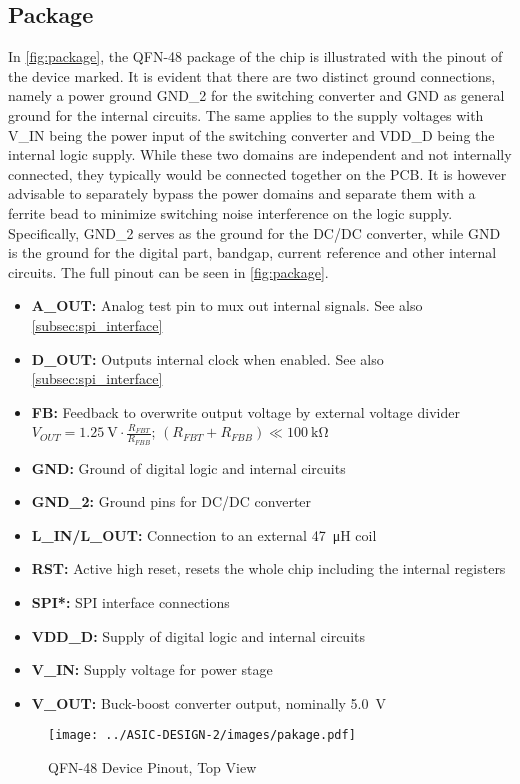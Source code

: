 \subsection{Package}
In \autoref{fig:package}, the QFN-48 package of the chip is illustrated with the pinout of the device marked. It is evident that there are two distinct ground connections, namely a power ground GND\_2 for the switching converter and GND as general ground for the internal circuits. The same applies to the supply voltages with V\_IN being the power input of the switching converter and VDD\_D being the internal logic supply. While these two domains are independent and not internally connected, they typically would be connected together on the \ac{PCB}. It is however advisable to separately bypass the power domains and separate them with a ferrite bead to minimize switching noise interference on the logic supply. Specifically, GND\_2 serves as the ground for the DC/DC converter, while GND is the ground for the digital part, bandgap, current reference and other internal circuits. The full pinout can be seen in \autoref{fig:package}.
\begin{itemize}
	\item \textbf{A\_OUT:} Analog test pin to mux out internal signals. See also \autoref{subsec:spi_interface}
	\item \textbf{D\_OUT:} Outputs internal clock when enabled. See also \autoref{subsec:spi_interface}
	\item \textbf{FB:} Feedback to overwrite output voltage by external voltage divider \\
            $V_{OUT} = \qty{1.25}{\volt} \cdot \frac{R_{FBT}}{R_{FBB}}$; $(R_{FBT}+R_{FBB}) \ll \qty{100}{\kilo\ohm}$
	\item \textbf{GND:} Ground of digital logic and internal circuits
	\item \textbf{GND\_2:} Ground pins for DC/DC converter
	\item \textbf{L\_IN/L\_OUT:} Connection to an external \qty{47}{\micro\henry} coil
	\item \textbf{RST:} Active high reset, resets the whole chip including the internal registers
	\item \textbf{SPI*:} SPI interface connections
	\item \textbf{VDD\_D:} Supply of digital logic and internal circuits
	\item \textbf{V\_IN:} Supply voltage for power stage
	\item \textbf{V\_OUT:} Buck-boost converter output, nominally \qty{5.0}{\volt}
\end{itemize}
\begin{figure}[h]
	\centering
	\texttt{[image: ../ASIC-DESIGN-2/images/pakage.pdf]}
	\caption{QFN-48 Device Pinout, Top View}
	\label{fig:package}
\end{figure}
